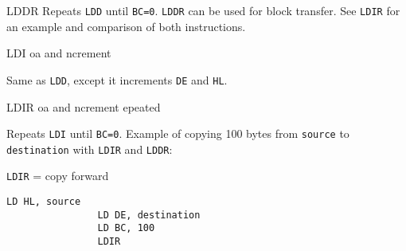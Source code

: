\begin{basedescript}{
    \desclabelstyle{\multilinelabel}
    \desclabelwidth{3cm}}
\begin{DetailItem}{LDDR}
        Repeats {\tt LDD} until {\tt BC=0}. {\tt LDDR} can be used for block transfer. See {\tt LDIR} for an example and comparison of both instructions.

        \begin{DetailEffects}
            \FlagsLDDR
        \end{DetailEffects}
				
        \begin{DetailTiming}
        \end{DetailTiming}

    \end{DetailItem}


    \begin{DetailItem}{LDI}
        {oa and ncrement}		
        {\SymLDI}

        Same as {\tt LDD}, except it increments {\tt DE} and {\tt HL}.

        \begin{DetailEffects}
            \FlagsLDI
        \end{DetailEffects}
				
        \begin{DetailTiming}
        \end{DetailTiming}

    \end{DetailItem}

    \begin{DetailItem}{LDIR}
        {oa and ncrement epeated}		
        {\SymLDIR}

        Repeats {\tt LDI} until {\tt BC=0}. Example of copying 100 bytes from {\tt source} to {\tt destination} with {\tt LDIR} and {\tt LDDR}:

        \begin{multicols}{2}
            {\tt LDIR} = copy forward
            \begin{lstlisting}[autogobble=true, xrightmargin=1em]
                LD HL, source
                LD DE, destination
                LD BC, 100
                LDIR
            \end{lstlisting}
			

\end{multicols}
\end{DetailItem}
\end{basedescript}
